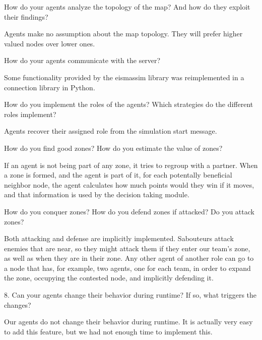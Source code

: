 \begin{question}
How do your agents analyze the topology of the map? And how do they exploit
their findings? 
\end{question}

Agents make no assumption about the map topology. They will
prefer higher valued nodes over lower ones.


\begin{question}
How do your agents communicate with the server?  
\end{question}

Some functionality
provided by the eismassim library was reimplemented in a connection library in
Python.

\begin{question}
How do you implement the roles of the agents? Which strategies do the
different roles implement?  
\end{question}

Agents recover their assigned role from the
simulation start message.  

\begin{question}
How do you find good zones? How do you estimate the value of zones?  
\end{question}

If an
agent is not being part of any zone, it tries to regroup with a partner.  When
a zone is formed, and the agent is part of it, for each potentally beneficial
neighbor node, the agent calculates how much points would they win if it
moves, and that information is used by the decision taking module.

\begin{question}
How do you conquer zones? How do you defend zones if attacked? Do you
attack zones?  
\end{question}

Both attacking and defense are implicitly implemented.
Sabouteurs attack enemies that are near, so they might attack them if they
enter our team's zone, as well as when they are in their zone. Any other agent
of another role can go to a node that has, for example, two agents, one for
each team, in order to expand the zone, occupying the contested node, and
implicitly defending it.

\begin{question}
8. Can your agents change their behavior during runtime? If so, what triggers
the changes?  
\end{question}

Our agents do not change their behavior during runtime. It is
actually very easy to add this feature, but we had not enough time to
implement this.

